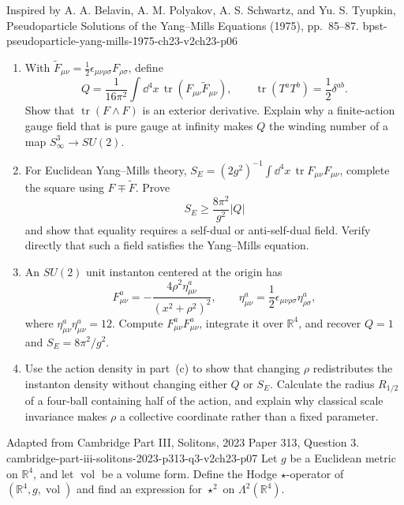 \begin{enumerate}
  {Inspired by A. A. Belavin, A. M. Polyakov, A. S. Schwartz, and
  Yu. S. Tyupkin, Pseudoparticle Solutions of the Yang--Mills
  Equations (1975), pp.~85--87.}
  {bpst-pseudoparticle-yang-mills-1975-ch23-v2ch23-p06}
  \begin{enumerate}
    \item[(a)]
    With
    \(\widetilde F_{\mu\nu}
      =\tfrac12\epsilon_{\mu\nu\rho\sigma}F_{\rho\sigma}\),
    define
    \[
      Q=\frac1{16\pi^2}\int \dd^4x\,
         \operatorname{tr}(F_{\mu\nu}\widetilde F_{\mu\nu}),
      \qquad
      \operatorname{tr}(T^aT^b)=\frac12\delta^{ab}.
    \]
    Show that \(\operatorname{tr}(F\wedge F)\) is an exterior derivative.
    Explain why a finite-action gauge field that is pure gauge at infinity
    makes \(Q\) the winding number of a map \(S^3_\infty\to SU(2)\).
    \item[(b)]
    For Euclidean Yang--Mills theory,
    \(S_E=(2g^2)^{-1}\int \dd^4x\,\operatorname{tr}F_{\mu\nu}F_{\mu\nu}\),
    complete the square using \(F\mp\widetilde F\).  Prove
    \[
      S_E\ge\frac{8\pi^2}{g^2}\lvert Q\rvert
    \]
    and show that equality requires a self-dual or anti-self-dual field.
    Verify directly that such a field satisfies the Yang--Mills equation.
    \item[(c)]
    An \(SU(2)\) unit instanton centered at the origin has
    \[
      F_{\mu\nu}^a
        =-\frac{4\rho^2\eta^a_{\mu\nu}}
         {(x^2+\rho^2)^2},
      \qquad
      \eta^a_{\mu\nu}
        =\frac12\epsilon_{\mu\nu\rho\sigma}
          \eta^a_{\rho\sigma},
    \]
    where
    \(\eta^a_{\mu\nu}\eta^a_{\mu\nu}=12\).
    Compute \(F_{\mu\nu}^aF_{\mu\nu}^a\), integrate it over
    \(\mathbb R^4\), and recover \(Q=1\) and
    \(S_E=8\pi^2/g^2\).
    \item[(d)]
    Use the action density in part~(c) to show that changing
    \(\rho\) redistributes the instanton density without changing either
    \(Q\) or \(S_E\).  Calculate the radius \(R_{1/2}\) of a four-ball
    containing half of the action, and explain why classical scale
    invariance makes \(\rho\) a collective coordinate rather than a
    fixed parameter.
  \end{enumerate}

  {Adapted from Cambridge Part III, Solitons, 2023 Paper 313,
  Question 3.}
  {cambridge-part-iii-solitons-2023-p313-q3-v2ch23-p07}
  Let \(g\) be a Euclidean metric on \(\mathbb R^4\), and let
  \(\operatorname{vol}\) be a volume form.  Define the Hodge
  \(\star\)-operator of
  \((\mathbb R^4,g,\operatorname{vol})\) and find an expression for
  \(\star^2\) on \(\Lambda^2(\mathbb R^4)\).


\end{enumerate}
